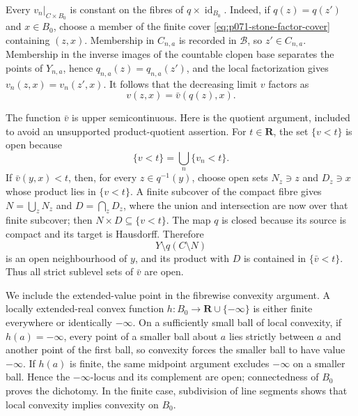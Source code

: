 Every \(v_n|_{C\times B_0}\) is constant on the fibres of
\(q\times\operatorname{id}_{B_0}\).  Indeed, if \(q(z)=q(z')\) and
\(x\in B_0\), choose a member of the finite cover
\eqref{eq:p071-stone-factor-cover} containing
\((z,x)\).  Membership in \(C_{n,a}\) is recorded in \(\mathcal B\), so
\(z'\in C_{n,a}\).  Membership in the inverse images of the countable
clopen base separates the points of \(Y_{n,a}\), hence
\(q_{n,a}(z)=q_{n,a}(z')\), and the local factorization gives
\(v_n(z,x)=v_n(z',x)\).  It follows that the decreasing limit \(v\) factors
as
\begin{equation}
\label{eq:p071-stone-limit-factor}
                         v(z,x)=\bar v(q(z),x).
\end{equation}

The function \(\bar v\) is upper semicontinuous.  Here is the quotient
argument, included to avoid an unsupported product-quotient assertion.
For \(t\in\mathbf R\), the set \(\{v<t\}\) is open because
\begin{equation}
\label{eq:p071-stone-sublevel-union}
                       \{v<t\}=\bigcup_n\{v_n<t\}.
\end{equation}
If \(\bar v(y,x)<t\), then, for every \(z\in q^{-1}(y)\), choose open
sets \(N_z\ni z\) and \(D_z\ni x\) whose product lies in \(\{v<t\}\).
A finite subcover of the compact fibre gives
\(N=\bigcup_zN_z\) and \(D=\bigcap_zD_z\), where the union and intersection
are now over that finite subcover; then
\(N\times D\subseteq\{v<t\}\).  The map \(q\) is closed because its source
is compact and its target is Hausdorff.  Therefore
\begin{equation}
\label{eq:p071-stone-quotient-neighbourhood}
                       Y\setminus q(C\setminus N)
\end{equation}
is an open neighbourhood of \(y\), and its product with \(D\) is contained
in \(\{\bar v<t\}\).  Thus all strict sublevel sets of \(\bar v\) are open.

We include the extended-value point in the fibrewise convexity argument.
A locally extended-real convex function
\(h:B_0\to\mathbf R\cup\{-\infty\}\) is either finite everywhere or
identically \(-\infty\).  On a sufficiently small ball of local convexity,
if \(h(a)=-\infty\), every point of a smaller ball about \(a\) lies
strictly between \(a\) and another point of the first ball, so convexity
forces the smaller ball to have value \(-\infty\).  If \(h(a)\) is finite,
the same midpoint argument excludes \(-\infty\) on a smaller ball.  Hence
the \(-\infty\)-locus and its complement are open; connectedness of \(B_0\)
proves the dichotomy.  In the finite case, subdivision of line segments
shows that local convexity implies convexity on \(B_0\).

